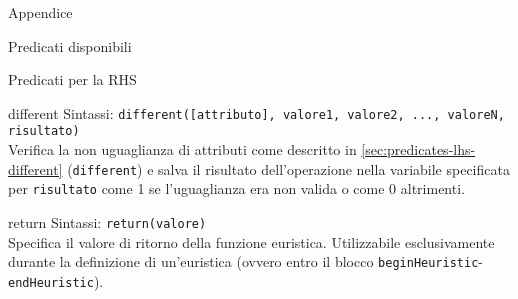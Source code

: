 \begin{chapter}{Appendice}
\begin{section}{Predicati disponibili}
\begin{subsection}{Predicati per la RHS}
		\begin{subsubsection}{different}
		\label{sec:predicates-rhs-different}
		Sintassi: \verb!different([attributo], valore1, valore2, ..., valoreN, risultato)!\\
		Verifica la non uguaglianza di attributi come descritto in \ref{sec:predicates-lhs-different}
		(\verb,different,) e salva il risultato dell'operazione nella variabile specificata per
		\verb,risultato, come 1 se l'uguaglianza era non valida o come 0 altrimenti.
		\end{subsubsection}

        \begin{subsubsection}{return}
        \label{sec:predicates-rhs-return}
        Sintassi: \verb!return(valore)!\\
        Specifica il valore di ritorno della funzione euristica. Utilizzabile esclusivamente durante
        la definizione di un'euristica (ovvero entro il blocco \verb,beginHeuristic,-\verb,endHeuristic,).
        \end{subsubsection}

	\end{subsection}
\end{section}

\end{chapter}

